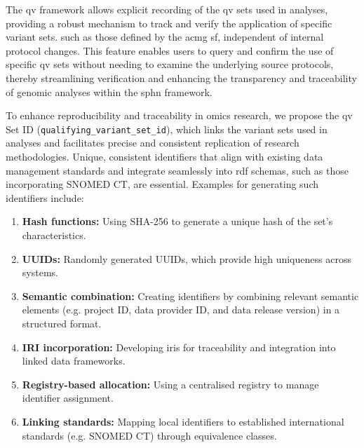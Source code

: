The \ac{qv} framework allows explicit recording of the \ac{qv} sets used in analyses, providing a robust mechanism to track and verify the application of specific variant sets. such as those defined by the \ac{acmg} \ac{sf}, independent of internal protocol changes. This feature enables users to query and confirm the use of specific \ac{qv} sets without needing to examine the underlying source protocols, thereby streamlining verification and enhancing the transparency and traceability of genomic analyses within the \ac{sphn} framework.

To enhance reproducibility and traceability in omics research, we propose the \ac{qv} Set ID (\texttt{qualifying\_variant\_set\_id}), which links the variant sets used in analyses and facilitates precise and consistent replication of research methodologies. Unique, consistent identifiers that align with existing data management standards and integrate seamlessly into \ac{rdf} schemas, such as those incorporating SNOMED CT, are essential. Examples for generating such identifiers include:
\begin{enumerate}
    \item \textbf{Hash functions:} Using SHA-256 to generate a unique hash of the set's characteristics.
    \item \textbf{UUIDs:} Randomly generated UUIDs, which provide high uniqueness across systems.
    \item \textbf{Semantic combination:} Creating identifiers by combining relevant semantic elements (e.g. project ID, data provider ID, and data release version) in a structured format.
    \item \textbf{IRI incorporation:} Developing \ac{iri}s for traceability and integration into linked data frameworks.
    \item \textbf{Registry-based allocation:} Using a centralised registry to manage identifier assignment.
    \item \textbf{Linking standards:} Mapping local identifiers to established international standards (e.g. SNOMED CT) through equivalence classes.
\end{enumerate}


